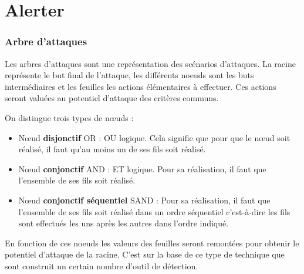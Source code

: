 \section{Alerter}

\subsubsection{Arbre d'attaques} \label{ref_arbre_attaques}


Les arbres d'attaques sont une représentation des scénarios d'attaques. La racine représente le but final de l'attaque, les différents noeuds sont les buts intermédiaires et les feuilles les actions élémentaires à effectuer. Ces actions seront valuées au potentiel d'attaque des critères communs. 

On distingue trois types de nœuds :

\begin{itemize}
  \item Nœud \textbf{disjonctif} OR : OU logique. Cela signifie que pour que le nœud soit réalisé, il faut qu’au moins un de ses fils soit réalisé.
  \item Nœud \textbf{conjonctif} AND : ET logique. Pour sa réalisation, il faut que l’ensemble de ses fils soit réalisé.
  \item Nœud \textbf{conjonctif séquentiel }SAND : Pour sa réalisation, il faut que l'ensemble de ses fils soit réalisé dans un ordre séquentiel c'est-à-dire les fils sont effectués les uns après les autres dans l’ordre indiqué.
\end{itemize}


En fonction de ces noeuds les valeurs des feuilles seront remontées pour obtenir le potentiel d'attaque de la racine.
C'est sur la base de ce type de technique que sont construit un certain nombre d'outil de détection.
 


